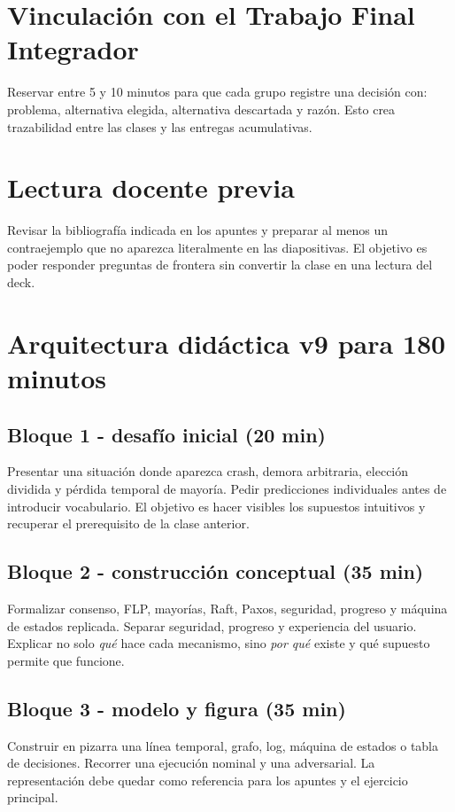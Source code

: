 \documentclass[variant=docente,cover=institutional,mode=screen]{ua-engineering-v6-article}
\begin{document}
\section{Vinculación con el Trabajo Final Integrador}
Reservar entre 5 y 10 minutos para que cada grupo registre una decisión con: problema, alternativa elegida, alternativa descartada y razón. Esto crea trazabilidad entre las clases y las entregas acumulativas.
\section{Lectura docente previa}
Revisar la bibliografía indicada en los apuntes y preparar al menos un contraejemplo que no aparezca literalmente en las diapositivas. El objetivo es poder responder preguntas de frontera sin convertir la clase en una lectura del deck.

\section{Arquitectura didáctica v9 para 180 minutos}
\subsection*{Bloque 1 - desafío inicial (20 min)}
Presentar una situación donde aparezca crash, demora arbitraria, elección dividida y pérdida temporal de mayoría. Pedir predicciones individuales antes de introducir vocabulario. El objetivo es hacer visibles los supuestos intuitivos y recuperar el prerequisito de la clase anterior.

\subsection*{Bloque 2 - construcción conceptual (35 min)}
Formalizar consenso, FLP, mayorías, Raft, Paxos, seguridad, progreso y máquina de estados replicada. Separar seguridad, progreso y experiencia del usuario. Explicar no solo \emph{qué} hace cada mecanismo, sino \emph{por qué} existe y qué supuesto permite que funcione.

\subsection*{Bloque 3 - modelo y figura (35 min)}
Construir en pizarra una línea temporal, grafo, log, máquina de estados o tabla de decisiones. Recorrer una ejecución nominal y una adversarial. La representación debe quedar como referencia para los apuntes y el ejercicio principal.
\end{document}
